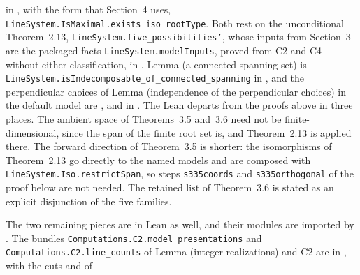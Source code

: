 in , with the form that Section~4 uses,
\texttt{LineSystem.\allowbreak IsMaximal.\allowbreak exists\_\allowbreak iso\_\allowbreak rootType}.
Both rest on the unconditional Theorem~2.13,
\texttt{LineSystem.\allowbreak five\_\allowbreak possibilities'}, whose inputs from Section~3 are
the packaged facts \texttt{LineSystem.\allowbreak modelInputs}, proved from C2 and C4
without either classification, in .
Lemma (a connected spanning set) is
\texttt{LineSystem.\allowbreak isIndecomposable\_\allowbreak of\_\allowbreak connected\_\allowbreak spanning}
in , and the perpendicular choices of
Lemma (independence of the perpendicular choices) in the default model are
,
and
in . The Lean departs from the proofs above in three
places. The ambient space of Theorems~3.5 and~3.6 need not be finite-dimensional, since the
span of the finite root set is, and Theorem~2.13 is applied there. The forward direction of
Theorem~3.5 is shorter: the isomorphisms of Theorem~2.13 go directly to the named models and are
composed with \texttt{LineSystem.\allowbreak Iso.\allowbreak restrictSpan}, so steps
\texttt{s335coords} and \texttt{s335orthogonal} of the proof below are not needed. The retained list of
Theorem~3.6 is stated as an explicit disjunction of the five families.\par
The two remaining pieces are in Lean as well, and their modules are imported by
. The bundles
\texttt{Computations.\allowbreak C2.\allowbreak model\_\allowbreak presentations} and
\texttt{Computations.\allowbreak C2.\allowbreak line\_\allowbreak counts} of
Lemma (integer realizations) and C2 are in , with the cuts
 and
 of
